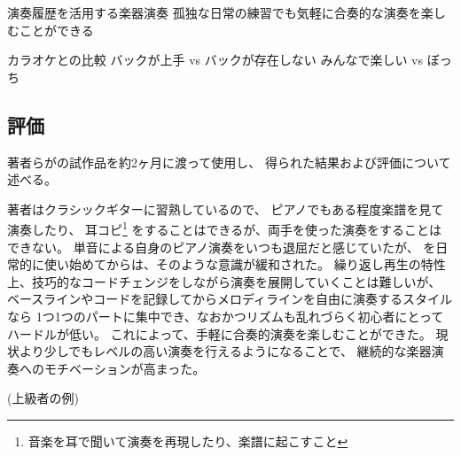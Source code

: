 演奏履歴を活用する楽器演奏
孤独な日常の練習でも気軽に合奏的な演奏を楽しむことができる

カラオケとの比較
バックが上手 vs バックが存在しない
みんなで楽しい vs ぼっち

\subsection{評価}

著者らが{\system}の試作品を約2ヶ月に渡って使用し、
得られた結果および評価について述べる。



著者はクラシックギターに習熟しているので、
ピアノでもある程度楽譜を見て演奏したり、
耳コピ\footnote{\textsf{音楽を耳で聞いて演奏を再現したり、楽譜に起こすこと}}
をすることはできるが、両手を使った演奏をすることはできない。
単音による自身のピアノ演奏をいつも退屈だと感じていたが、
{\system}を日常的に使い始めてからは、そのような意識が緩和された。
繰り返し再生の特性上、技巧的なコードチェンジをしながら演奏を展開していくことは難しいが、
ベースラインやコードを記録してからメロディラインを自由に演奏するスタイルなら
1つ1つのパートに集中でき、なおかつリズムも乱れづらく初心者にとってハードルが低い。
これによって、手軽に合奏的演奏を楽しむことができた。
現状より少しでもレベルの高い演奏を行えるようになることで、
継続的な楽器演奏へのモチベーションが高まった。

(上級者の例)

